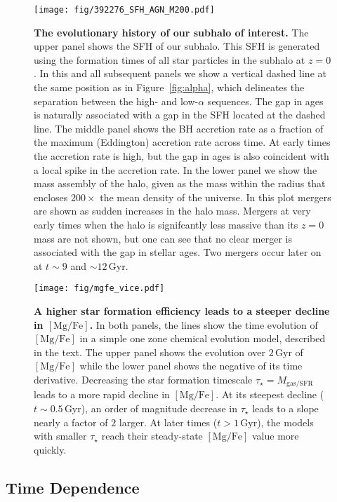 \documentclass[linenumbers, twocolumn]{aastex631}
\newcommand{\Gyr}{\ensuremath{\textrm{Gyr}}}
\newcommand{\MgFe}{\ensuremath{[\textrm{Mg}/\textrm{Fe}]}}
\begin{document}
\begin{figure}
  \centering
  \texttt{[image: fig/392276\_SFH\_AGN\_M200.pdf]}
  \caption{\textbf{The evolutionary history of our subhalo of interest.} The upper panel shows the SFH of our subhalo. This SFH is generated using the formation times of all star particles in the subhalo at $z=0$. In this and all subsequent panels we show a vertical dashed line at the same position as in Figure~\ref{fig:alpha}, which delineates the separation between the high- and low-$\alpha$ sequences. The gap in ages is naturally associated with a gap in the SFH located at the dashed line. The middle panel shows the BH accretion rate as a fraction of the maximum (Eddington) accretion rate across time. At early times the accretion rate is high, but the gap in ages is also coincident with a local spike in the accretion rate. In the lower panel we show the mass assembly of the halo, given as the mass within the radius that encloses $200\times$ the mean density of the universe. In this plot mergers are shown as sudden increases in the halo mass. Mergers at very early times when the halo is signifcantly less massive than its $z=0$ mass are not shown, but one can see that no clear merger is associated with the gap in stellar ages. Two mergers occur later on at $t\sim9$ and $\sim12\,\Gyr$.}
  \label{fig:history}
\end{figure}

\begin{figure}
  \centering
  \texttt{[image: fig/mgfe\_vice.pdf]}
  \caption{\textbf{A higher star formation efficiency leads to a steeper decline in \MgFe{}.} In both panels, the lines show the time evolution of \MgFe{} in a simple one zone chemical evolution model, described in the text. The upper panel shows the evolution over $2\,\Gyr$ of \MgFe{} while the lower panel shows the negative of its time derivative. Decreasing the star formation timescale $\tau_{\star}=M_{\textrm{gas}/\textrm{SFR}}$ leads to a more rapid decline in \MgFe{}. At its steepest decline ($t\sim0.5\,\Gyr$), an order of magnitude decrease in $\tau_{\star}$ leads to a slope nearly a factor of $2$ larger. At later times ($t>1\,\Gyr$), the models with smaller $\tau_{\star}$ reach their steady-state \MgFe{} value more quickly.}
  \label{fig:vice}
\end{figure}

\subsection{Time Dependence}\label{sec:timedep}
\end{document}
